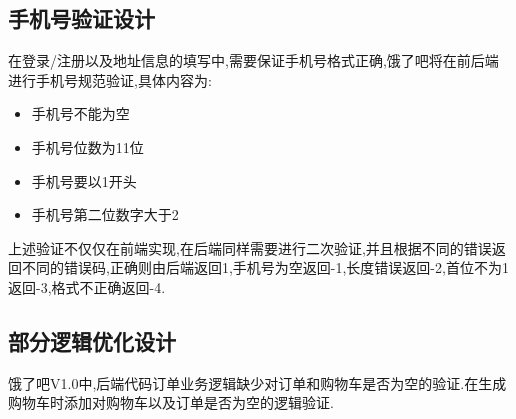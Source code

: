 \subsection{手机号验证设计}
在登录/注册以及地址信息的填写中,需要保证手机号格式正确,饿了吧将在前后端进行手机号规范验证,具体内容为:
\begin{itemize}
    \item 手机号不能为空
    \item 手机号位数为11位
    \item 手机号要以1开头
    \item 手机号第二位数字大于2
\end{itemize}
上述验证不仅仅在前端实现,在后端同样需要进行二次验证,并且根据不同的错误返回不同的错误码,正确则由后端返回1,手机号为空返回-1,长度错误返回-2,首位不为1返回-3,格式不正确返回-4.

\subsection{部分逻辑优化设计}
饿了吧V1.0中,后端代码订单业务逻辑缺少对订单和购物车是否为空的验证.在生成购物车时添加对购物车以及订单是否为空的逻辑验证.